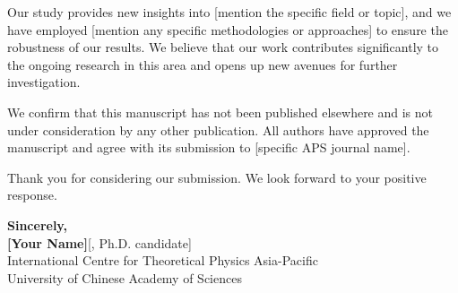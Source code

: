 \documentclass[a4paper,12pt]{article}
\newcommand{\MyColor}{MyBlue} %
\begin{document}
\vspace{0.5cm}

Our study provides new insights into [mention the specific field or topic], and we have employed [mention any specific methodologies or approaches] to ensure the robustness of our results. We believe that our work contributes significantly to the ongoing research in this area and opens up new avenues for further investigation.

\vspace{0.5cm}

We confirm that this manuscript has not been published elsewhere and is not under consideration by any other publication. All authors have approved the manuscript and agree with its submission to [specific APS journal name].

\vspace{0.5cm}

Thank you for considering our submission. We look forward to your positive response.

\vspace{1cm}

\begin{flushright}
    \begin{minipage}{1.0\textwidth} %
        \raggedright
        \textbf{\textcolor{\MyColor}{Sincerely,}} \\
        \vspace{0.5cm}
        \textbf{\textcolor{\MyColor}{[Your Name]}}[, Ph.D. candidate] \\ %
        International Centre for Theoretical Physics Asia-Pacific \\
        University of Chinese Academy of Sciences   \\
    \end{minipage}
\end{flushright}
\end{document}

